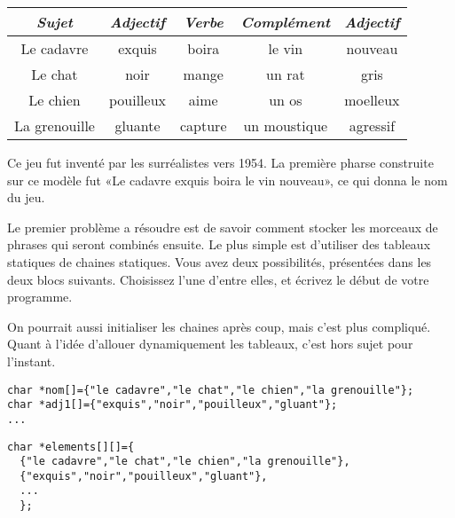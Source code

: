 \documentclass[10pt]{article}\usepackage[correction]{esial}
\begin{document}
\medskip\noindent\begin{minipage}{.6\linewidth}
  \begin{tabular}{|c|c|c|c|c|}\hline
    \textit{Sujet}&\textit{Adjectif}&\textit{Verbe}&\textit{Complément}&\textit{Adjectif}
    \\\hline
    Le cadavre&exquis&boira&le vin&nouveau\\\hline
    Le chat&noir&mange&un rat&gris\\\hline
    Le chien&pouilleux&aime&un os&moelleux\\\hline
    La grenouille&gluante&capture&un moustique&agressif\\\hline  
  \end{tabular}
\end{minipage}\hfill\begin{minipage}{.35\linewidth}
  Ce jeu fut inventé par les surréalistes vers 1954. La première
  pharse construite sur ce modèle fut «Le cadavre exquis boira le vin nouveau»,
  ce qui donna le nom du jeu.
\end{minipage}

\Question Le premier problème a résoudre est de savoir comment stocker les
morceaux de phrases qui seront combinés ensuite. Le plus simple est d'utiliser
des tableaux statiques de chaines statiques. Vous avez deux possibilités,
présentées dans les deux blocs suivants. Choisissez l'une d'entre elles, et
écrivez le début de votre programme. 

\begin{Reponse}
  On pourrait aussi initialiser les chaines après coup, mais c'est plus
  compliqué. Quant à l'idée d'allouer dynamiquement les tableaux, c'est hors
  sujet pour l'instant.
\end{Reponse}

\begin{Verbatim}[label=Première approche pour le stockage des données]
char *nom[]={"le cadavre","le chat","le chien","la grenouille"};
char *adj1[]={"exquis","noir","pouilleux","gluant"};
...  
\end{Verbatim}

\begin{Verbatim}[label=Deuxieme approche pour le stockage des données]
char *elements[][]={
  {"le cadavre","le chat","le chien","la grenouille"},
  {"exquis","noir","pouilleux","gluant"},
  ...
  };
\end{Verbatim}
\end{document}

